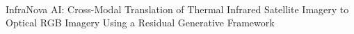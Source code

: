 \documentclass[10pt,a4paper,twoside]{article}
\begin{document}
\justifying %

\thispagestyle{empty}

\\[4pt]
{\LARGE\bfseries\raggedright InfraNova AI: Cross-Modal Translation of Thermal Infrared Satellite Imagery to Optical RGB Imagery Using a Residual Generative Framework\par}
\vspace{10pt}
\vspace{14pt}
\end{document}
